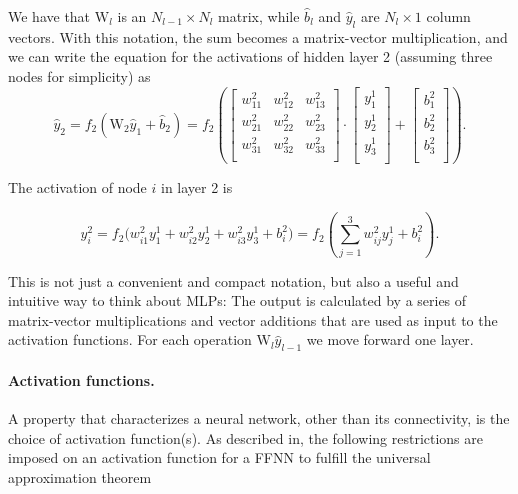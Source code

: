 We have that $\mathrm{W}_l$ is an $N_{l-1} \times N_l$ matrix, while $\hat{b}_l$ and $\hat{y}_l$ are $N_l \times 1$ column vectors. 
With this notation, the sum becomes a matrix-vector multiplication, and we can write
the equation for the activations of hidden layer 2 (assuming three nodes for simplicity) as
\begin{equation}
 \hat{y}_2 = f_2(\mathrm{W}_2 \hat{y}_{1} + \hat{b}_{2}) = 
 f_2\left(\left[\begin{array}{ccc}
    w^2_{11} &w^2_{12} &w^2_{13} \\
    w^2_{21} &w^2_{22} &w^2_{23} \\
    w^2_{31} &w^2_{32} &w^2_{33} \\
    \end{array} \right] \cdot
    \left[\begin{array}{c}
           y^1_1 \\
           y^1_2 \\
           y^1_3 \\
          \end{array}\right] + 
    \left[\begin{array}{c}
           b^2_1 \\
           b^2_2 \\
           b^2_3 \\
          \end{array}\right]\right).
\end{equation}

The activation of node $i$ in layer 2 is

\begin{equation}
 y^2_i = f_2\Bigr(w^2_{i1}y^1_1 + w^2_{i2}y^1_2 + w^2_{i3}y^1_3 + b^2_i\Bigr) = 
 f_2\left(\sum_{j=1}^3 w^2_{ij} y_j^1 + b^2_i\right).
\end{equation}

This is not just a convenient and compact notation, but also a useful
and intuitive way to think about MLPs: The output is calculated by a
series of matrix-vector multiplications and vector additions that are
used as input to the activation functions. For each operation
$\mathrm{W}_l \hat{y}_{l-1}$ we move forward one layer.

\paragraph{Activation functions.}
A property that characterizes a neural network, other than its
connectivity, is the choice of activation function(s).  As described
in, the following restrictions are imposed on an activation function
for a FFNN to fulfill the universal approximation theorem

